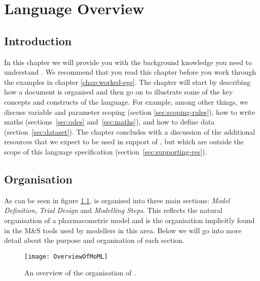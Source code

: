 \newcommand{\phsec}[1]{{\slshape #1}}
\chapter{Language Overview}
\label{chap:lang-overview}

\section{Introduction}

In this chapter we will provide you with the background knowledge you
need to understand \pharmml. We recommend that you read this chapter
before you work through the examples in chapter
\ref{chap:worked-egs}. The chapter will start by describing how a
\pharmml document is organised and then go on to illustrate some of
the key concepts and constructs of the language. For example, among
other things, we discuss variable and parameter scoping (section
\ref{sec:scoping-rules}), how to write maths (sections~\ref{sec:odes}
and~\ref{sec:maths}), and how to define data (section~\ref{sec:dataset}).
The chapter concludes with a discussion of the additional resources that
we expect to be used in support of \pharmml, but which are outside the
scope of this language specification (section~\ref{sec:supporting-res}).

\section{Organisation}
\label{sec:structure-overview}

As can be seen in figure \ref{fig:momloverview}, \pharmml is organised
into three main sections: \phsec{Model Definition}, \phsec{Trial
  Design} and \phsec{Modelling Steps}. This reflects the natural
organisation of a pharmacometric model and is the organisation
implicitly found in the M\&S tools used by modellers in this
area. Below we will go into more detail about the purpose and
organisation of each section.


\begin{figure}[htb]
 \centering
  \texttt{[image: OverviewOfMoML]}
  \caption{An overview of the organisation of \pharmml.}
  \label{fig:momloverview}
\end{figure}

